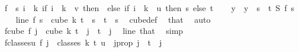\begin{isabellebody}
\ {\isacharquery}{\kern0pt}f\ {\isacharequal}{\kern0pt}\ {\isachardoublequoteopen}{\isasymlambda}s{\isachardot}{\kern0pt}\ {\isacharparenleft}{\kern0pt}{\isasymlambda}i\ {\isasymin}\ {\isacharbraceleft}{\kern0pt}{\isachardot}{\kern0pt}{\isachardot}{\kern0pt}{\isacharless}{\kern0pt}k{\isacharbraceright}{\kern0pt}{\isachardot}{\kern0pt}\ if\ i\ {\isacharless}{\kern0pt}\ k\ {\isacharminus}{\kern0pt}\ v\ then\ {}\ else\ {\isacharparenleft}{\kern0pt}if\ i\ {\isacharless}{\kern0pt}\ k\ {\isacharminus}{\kern0pt}\ u\ then\ s\ else\ t{\isacharparenright}{\kern0pt}{\isacharparenright}{\kern0pt}{\isachardoublequoteclose}\isanewline
\ \ \isamarkupfalse%
\ y\ \ {\isachardoublequoteopen}y\ {\isasymequiv}\ {\isacharparenleft}{\kern0pt}{\isasymlambda}s\ {\isasymin}\ {\isacharbraceleft}{\kern0pt}{\isachardot}{\kern0pt}{\isachardot}{\kern0pt}t{\isacharbraceright}{\kern0pt}{\isachardot}{\kern0pt}\ S\ {\isacharparenleft}{\kern0pt}{\isacharquery}{\kern0pt}f\ s{\isacharparenright}{\kern0pt}{\isacharparenright}{\kern0pt}{\isachardoublequoteclose}\isanewline
\isanewline
\ \ \isamarkupfalse%
\ line{}{\isacharcolon}{\kern0pt}\ {\isachardoublequoteopen}{\isacharquery}{\kern0pt}f\ s\ {\isasymin}\ cube\ k\ {\isacharparenleft}{\kern0pt}t{\isacharplus}{\kern0pt}{}{\isacharparenright}{\kern0pt}{\isachardoublequoteclose}\ \ {\isachardoublequoteopen}s\ {\isasymle}\ t{\isachardoublequoteclose}\ \ s\ \isamarkupfalse%
\ cube{\isacharunderscore}{\kern0pt}def\ \isamarkupfalse%
\ that\ \isamarkupfalse%
\ auto\isanewline
\isanewline
\ \ \isamarkupfalse%
\ f{\isacharunderscore}{\kern0pt}cube{\isacharcolon}{\kern0pt}\ {\isachardoublequoteopen}{\isacharquery}{\kern0pt}f\ j\ {\isasymin}\ cube\ k\ {\isacharparenleft}{\kern0pt}t{\isacharplus}{\kern0pt}{}{\isacharparenright}{\kern0pt}{\isachardoublequoteclose}\ \ {\isachardoublequoteopen}j\ {\isacharless}{\kern0pt}\ t{\isacharplus}{\kern0pt}{}{\isachardoublequoteclose}\ \ j\ \isamarkupfalse%
\ line{}\ that\ \isamarkupfalse%
\ simp\isanewline
\ \ \isamarkupfalse%
\ f{\isacharunderscore}{\kern0pt}classes{\isacharunderscore}{\kern0pt}u{\isacharcolon}{\kern0pt}\ {\isachardoublequoteopen}{\isacharquery}{\kern0pt}f\ j\ {\isasymin}\ classes\ k\ t\ u{\isachardoublequoteclose}\ \ j{\isacharunderscore}{\kern0pt}prop{\isacharcolon}{\kern0pt}\ {\isachardoublequoteopen}j\ {\isacharless}{\kern0pt}\ t{\isachardoublequoteclose}\ \ j\isanewline

\end{isabellebody}
